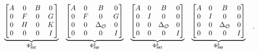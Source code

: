 \begin{equation}
\begin{matrix}
        \underbrace{\begin{bmatrix}
            A & 0 & B & 0 \\
            0 & F & 0 & G \\
            0 & H & 0 & K \\
            0 & 0 & 0 & I
        \end{bmatrix}}_{\Phi_{\texttt{F}\texttt{H}\texttt{T}}^{\texttt{S}}} &
        \underbrace{\begin{bmatrix}
            A & 0 & B & 0 \\
            0 & F & 0 & G \\
            0 & 0 & \Delta_{\mathcal{O}} & 0 \\
            0 & 0 & 0 & I
        \end{bmatrix}}_{\Phi_{\texttt{F}\texttt{H}\texttt{F}}^{\texttt{S}}} &
        \underbrace{\begin{bmatrix}
            A & 0 & B & 0 \\
            0 & I & 0 & 0 \\
            0 & 0 & \Delta_{\mathcal{O}} & 0 \\
            0 & 0 & 0 & I
        \end{bmatrix}}_{\Phi_{\texttt{F}\texttt{M}\texttt{T}}^{\texttt{S}}} &
        \underbrace{\begin{bmatrix}
            A & 0 & B & 0 \\
            0 & I & 0 & 0 \\
            0 & 0 & \Delta_{\mathcal{O}} & 0 \\
            0 & 0 & 0 & I
        \end{bmatrix}}_{\Phi_{\texttt{F}\texttt{M}\texttt{F}}^{\texttt{S}}} &
    \end{matrix}.
\end{equation}
